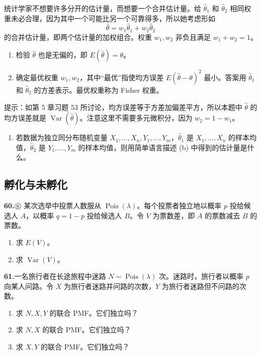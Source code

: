\documentclass[UTF8,12pt,a4paper,fontset=fandol]{ctexart}
\begin{document}
统计学家不想要许多分开的估计量，而想要一个合并估计量。给 $\hat\theta_1$ 和 $\hat\theta_2$ 相同权重未必合理，因为其中一个可能比另一个可靠得多，所以她考虑形如
\[
  \hat\theta=w_1\hat\theta_1+w_2\hat\theta_2
\]
的合并估计量，即两个估计量的加权组合。权重 $w_1,w_2$ 非负且满足 $w_1+w_2=1$。
\begin{enumerate}
  \item[(a)] 检验 $\hat\theta$ 也是无偏的，即 $E(\hat\theta)=\theta$。
  \item[(b)] 确定最优权重 $w_1,w_2$，其中“最优”指使均方误差 $E(\hat\theta-\theta)^2$ 最小。答案用 $\hat\theta_1$ 和 $\hat\theta_2$ 的方差表示。最优权重称为 Fisher 权重。
\end{enumerate}
提示：如第 5 章习题 53 所讨论，均方误差等于方差加偏差平方，所以本题中 $\hat\theta$ 的均方误差就是 $\operatorname{Var}(\hat\theta)$。注意这里不需要多元微积分，因为 $w_2=1-w_1$。
\begin{enumerate}
  \item[(c)] 若数据为独立同分布随机变量 $X_1,\ldots,X_n,Y_1,\ldots,Y_m$，$\hat\theta_1$ 是 $X_1,\ldots,X_n$ 的样本均值，$\hat\theta_2$ 是 $Y_1,\ldots,Y_m$ 的样本均值，则用简单语言描述 (b) 中得到的估计量是什么。
\end{enumerate}

\subsection*{孵化与未孵化}

\noindent\textbf{60.}\quad $\circledS$ 某次选举中投票人数服从 $\operatorname{Pois}(\lambda)$。每个投票者独立地以概率 $p$ 投给候选人 $A$，以概率 $q=1-p$ 投给候选人 $B$。令 $V$ 为票数差，即 $A$ 的票数减去 $B$ 的票数。
\begin{enumerate}
  \item[(a)] 求 $E(V)$。
  \item[(b)] 求 $\operatorname{Var}(V)$。
\end{enumerate}

\noindent\textbf{61.}\quad 一名旅行者在长途旅程中迷路 $N\sim \operatorname{Pois}(\lambda)$ 次。迷路时，旅行者以概率 $p$ 向某人问路。令 $X$ 为旅行者迷路并问路的次数，$Y$ 为旅行者迷路但不问路的次数。
\begin{enumerate}
  \item[(a)] 求 $N,X,Y$ 的联合 PMF。它们独立吗？
  \item[(b)] 求 $N,X$ 的联合 PMF。它们独立吗？
  \item[(c)] 求 $X,Y$ 的联合 PMF。它们独立吗？
\end{enumerate}
\end{document}
